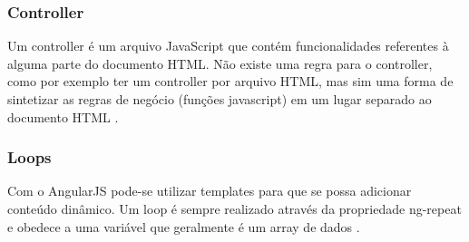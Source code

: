 \subsubsection{Controller}

\par Um controller é um arquivo JavaScript que contém funcionalidades
referentes à alguma parte do documento HTML.
Não existe uma regra para o controller, como por exemplo
ter um controller por arquivo HTML, mas sim uma forma de sintetizar as regras de negócio (funções
javascript) em um lugar separado ao documento HTML
\cite{livro_java_Guia_do_Programador}.

\subsubsection{Loops}

\par Com o AngularJS pode-se utilizar templates para que se possa
adicionar conteúdo dinâmico. Um loop é sempre realizado através da propriedade ng-repeat e obedece a uma variável
que geralmente é um array de dados \cite{livro_java_Guia_do_Programador}.


